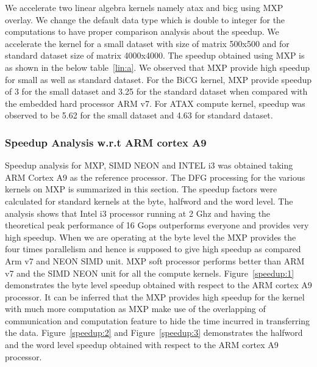 We accelerate two linear algebra kernels namely atax and bicg using MXP overlay. We change the default data type which is double to integer for the computations to have proper comparison analysis about the speedup. We accelerate the kernel for a small dataset with size of matrix 500x500 and for standard dataset size of matrix 4000x4000. The speedup obtained using MXP is as shown in the below table~\ref{lin:a}. We observed that MXP provide high speedup for small as well as standard dataset. For the BiCG kernel, MXP provide speedup of 3 for the small dataset and 3.25 for the standard dataset when compared with the embedded hard processor ARM v7. For ATAX compute kernel, speedup was observed to be 5.62 for the small dataset and 4.63 for standard dataset.



    
    
    \subsubsection{Speedup Analysis w.r.t ARM cortex A9}
    Speedup analysis for MXP, SIMD NEON and INTEL i3 was obtained taking ARM Cortex A9 as the reference processor. The DFG processing for the various kernels on MXP is summarized in this section. The speedup factors were calculated for standard kernels at the byte, halfword and the word level. The analysis shows that Intel i3 processor running at 2 Ghz and having the theoretical peak performance of 16 Gops outperforms everyone and provides very high speedup. When we are operating at the byte level the MXP provides the four times parallelism and hence is supposed to give high speedup as compared Arm v7 and NEON SIMD unit. MXP soft processor performs better than ARM v7 and the SIMD NEON unit for all the compute kernels. Figure~\ref{speedup:1} demonstrates the byte level speedup obtained with respect to the ARM cortex A9 processor. It can be inferred that the MXP provides high speedup for the kernel with much more computation as MXP make use of the overlapping of communication and computation feature to hide the time incurred in transferring the data. Figure~\ref{speedup:2} and Figure~\ref{speedup:3} demonstrates the halfword and the word level speedup obtained with respect to the ARM cortex A9 processor.
  
   
  
  
  
